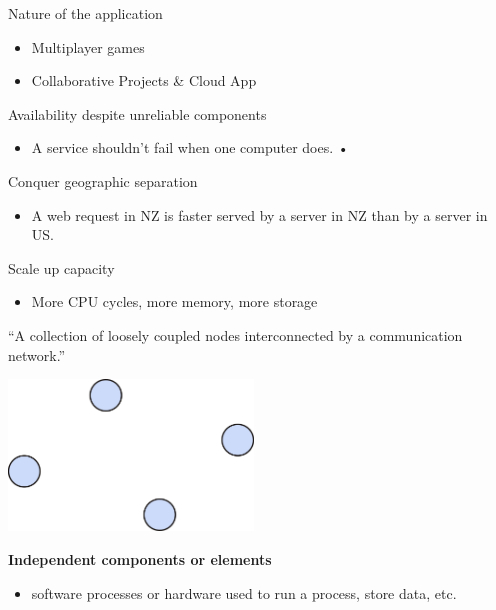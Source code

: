 \begin{slide}


    Nature of the application
    \begin{itemize}
        \item Multiplayer games
        \item Collaborative Projects \& Cloud App
    \end{itemize}
    \bigskip

    Availability despite unreliable components 
    \begin{itemize}
        \item A service shouldn’t fail when one computer does. • 
    \end{itemize}
    \bigskip

    Conquer geographic separation 
    \begin{itemize}
        \item A web request in NZ is faster served by a server in NZ than by a server in US.
    \end{itemize}
    \bigskip

    Scale up capacity 
    \begin{itemize}
        \item More CPU cycles, more memory, more storage
    \end{itemize}

\end{slide}

\begin{slide}


    \begin{exampleblock}{}
          {\large ``A collection of loosely coupled nodes interconnected by a communication network.''}
            \vskip5mm
              \hspace*{}
    \end{exampleblock}

\end{slide}

\begin{slide}


    \includegraphics[width=65mm]{dfs-definition-1.png}
    \bigskip

    \textbf{Independent components or elements}
    \begin{itemize}
        \item software processes or hardware used to run a process, store data, etc.
    \end{itemize}

\end{slide}


